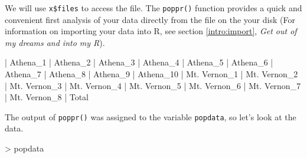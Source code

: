 \documentclass[letterpaper]{article}
\begin{document}
We will use \texttt{x\$files} to access the file. The \texttt{poppr()} function provides a quick and convenient first analysis of your data directly from the file on the your disk (For information on importing your data into R, see section \ref{intro:import}, \textit{Get out of my dreams and into my R}).
\begin{Schunk}
\end{Schunk}
\begin{Schunk}
\begin{Soutput}
| Athena_1 
| Athena_2 
| Athena_3 
| Athena_4 
| Athena_5 
| Athena_6 
| Athena_7 
| Athena_8 
| Athena_9 
| Athena_10 
| Mt. Vernon_1 
| Mt. Vernon_2 
| Mt. Vernon_3 
| Mt. Vernon_4 
| Mt. Vernon_5 
| Mt. Vernon_6 
| Mt. Vernon_7 
| Mt. Vernon_8 
| Total 
\end{Soutput}
\end{Schunk}
The output of \texttt{poppr()} was assigned to the variable \texttt{popdata}, so let's look at the data.
\begin{Schunk}
\begin{Sinput}
> popdata
\end{Sinput}
\end{Schunk}
\end{document}
